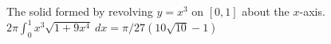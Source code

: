 {The solid formed by revolving $y=x^3$ on $[0,1]$ about the $x$-axis.}
{$2\pi\int_0^1 x^3\sqrt{1+9x^4}\ dx = \pi/27(10\sqrt{10}-1)$}
